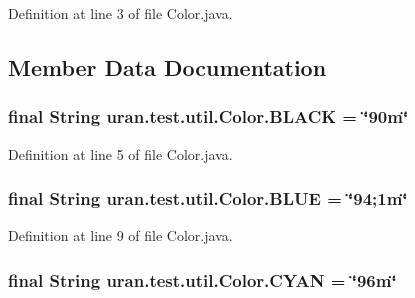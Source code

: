 Definition at line 3 of file Color.\+java.



\subsection{Member Data Documentation}
\hypertarget{classuran_1_1test_1_1util_1_1_color_aa5319694234f29d8952f96f279183b29}{}
\subsubsection[{B\+L\+A\+C\+K}]{\setlength{\rightskip}{0pt plus 5cm}final String uran.\+test.\+util.\+Color.\+B\+L\+A\+C\+K = \char`\"{}90m\char`\"{}\hspace{0.3cm}{\ttfamily [static]}}\label{classuran_1_1test_1_1util_1_1_color_aa5319694234f29d8952f96f279183b29}


Definition at line 5 of file Color.\+java.

\hypertarget{classuran_1_1test_1_1util_1_1_color_a3e5cae93909f68b41b95143eb0576e82}{}
\subsubsection[{B\+L\+U\+E}]{\setlength{\rightskip}{0pt plus 5cm}final String uran.\+test.\+util.\+Color.\+B\+L\+U\+E = \char`\"{}94;1m\char`\"{}\hspace{0.3cm}{\ttfamily [static]}}\label{classuran_1_1test_1_1util_1_1_color_a3e5cae93909f68b41b95143eb0576e82}


Definition at line 9 of file Color.\+java.

\hypertarget{classuran_1_1test_1_1util_1_1_color_a9357dc8aa61fa16f56e8c1b37097dc50}{}
\subsubsection[{C\+Y\+A\+N}]{\setlength{\rightskip}{0pt plus 5cm}final String uran.\+test.\+util.\+Color.\+C\+Y\+A\+N = \char`\"{}96m\char`\"{}\hspace{0.3cm}{\ttfamily [static]}}\label{classuran_1_1test_1_1util_1_1_color_a9357dc8aa61fa16f56e8c1b37097dc50}


